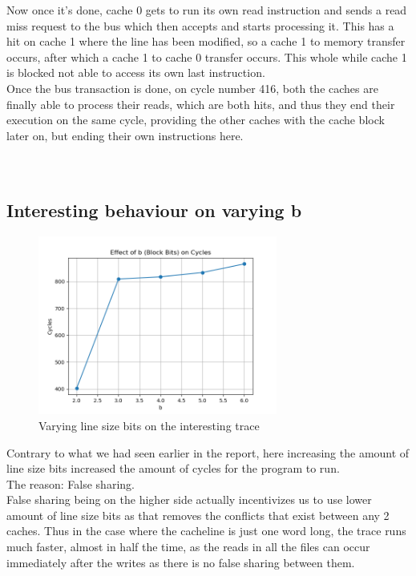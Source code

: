 \documentclass{article}
\begin{document}
Now once it's done, cache 0 gets to run its own read instruction and sends a read miss request to the bus which then accepts and starts processing it. This has a hit on cache 1 where the line has been modified, so a cache 1 to memory transfer occurs, after which a cache 1 to cache 0 transfer occurs. This whole while cache 1 is blocked not able to access its own last instruction.\\
Once the bus transaction is done, on cycle number 416, both the caches are finally able to process their reads, which are both hits, and thus they end their execution on the same cycle, providing the other caches with the cache block later on, but ending their own instructions here.\\
\\
\\

\subsection{Interesting behaviour on varying b}


\begin{figure}[h]
  \centering
  \includegraphics[width=0.7\textwidth]{plot_vary_b1.png}
  \caption{Varying line size bits on the interesting trace}
  \label{fig:arch}
\end{figure}

Contrary to what we had seen earlier in the report, here increasing the amount of line size bits increased the amount of cycles for the program to run.\\
The reason: False sharing.\\
False sharing being on the higher side actually incentivizes us to use lower amount of line size bits as that removes the conflicts that exist between any 2 caches. Thus in the case where the cacheline is just one word long, the trace runs much faster, almost in half the time, as the reads in all the files can occur immediately after the writes as there is no false sharing between them.\\
\end{document}
